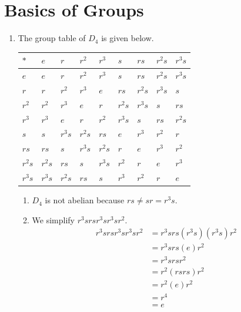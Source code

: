 \section{Basics of Groups}
\begin{enumerate}
    \item The group table of $D_4$ is given below.
    \begin{table}[h]
        \centering
        \begin{tabular}{|l|l|l|l|l|l|l|l|l|}
        \hline
        $\ast$ & $e$    & $r$    & $r^2$  & $r^3$  & $s$    & $rs$   & $r^2s$ & $r^3s$ \\ \hline
        $e$    & $e$    & $r$    & $r^2$  & $r^3$  & $s$    & $rs$   & $r^2s$ & $r^3s$ \\ \hline
        $r$    & $r$    & $r^2$  & $r^3$  & $e$    & $rs$   & $r^2s$ & $r^3s$ & $s$    \\ \hline
        $r^2$  & $r^2$  & $r^3$  & $e$    & $r$    & $r^2s$ & $r^3s$ & $s$    & $rs$   \\ \hline
        $r^3$  & $r^3$  & $e$    & $r$    & $r^2$  & $r^3s$ & $s$    & $rs$   & $r^2s$ \\ \hline
        $s$    & $s$    & $r^3s$ & $r^2s$ & $rs$   & $e$    & $r^3$  & $r^2$  & $r$    \\ \hline
        $rs$   & $rs$   & $s$    & $r^3s$ & $r^2s$ & $r$    & $e$    & $r^3$  & $r^2$  \\ \hline
        $r^2s$ & $r^2s$ & $rs$   & $s$    & $r^3s$ & $r^2$  & $r$    & $e$    & $r^3$  \\ \hline
        $r^3s$ & $r^3s$ & $r^2s$ & $rs$   & $s$    & $r^3$  & $r^2$  & $r$    & $e$    \\ \hline
        \end{tabular}
    \end{table}
    \begin{enumerate}[label=(\alph*)]
        \item $D_4$ is not abelian because $rs \neq sr = r^3s$.
        \item We simplify $r^3srsr^3sr^3sr^2$.
        \begin{align*}
            r^3 sr sr^3 sr^3 sr^2 &= r^3srs(r^3s)(r^3s)r^2\\
            &= r^3 srs(e)r^2\\
            &= r^3 sr sr^2\\
            &= r^2(rs rs)r^2\\
            &= r^2(e)r^2\\
            &= r^4\\
            &= e
        \end{align*}
    \end{enumerate}


\end{enumerate}
